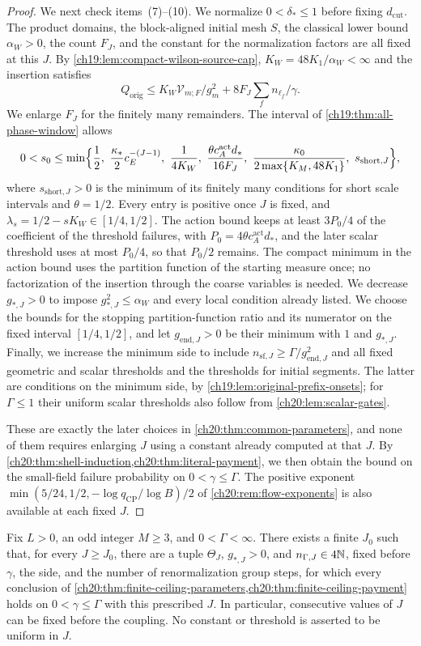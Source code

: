 \begin{proof}
We next check items~(7)--(10). We normalize $0<\delta_*\le1$ before fixing $d_{\mathrm{cut}}$. The product domains, the block-aligned initial mesh $S$, the classical lower bound $\alpha_W>0$, the count $F_J$, and the constant for the normalization factors are all fixed at this $J$. By \cref{ch19:lem:compact-wilson-source-cap}, $K_W=48K_1/\alpha_W<\infty$ and the insertion satisfies
\[
 Q_{\mathrm{orig}}\le K_W\mathcal V_{m;F}/g_m^2+8F_J\sum_fn_{\ell_f}/\gamma.
\]
We enlarge $F_J$ for the finitely many remainders. The interval of \cref{ch19:thm:all-phase-window} allows
\[
 0<s_0\le\min\Bigl\{\frac12,\ \frac{\kappa_*}2c_E^{-(J-1)},\ \frac1{4K_W},\ \frac{\theta c_A^{\mathrm{act}}d_*}{16F_J},\ \frac{\kappa_0}{2\max\{K_M,48K_1\}},\ s_{\mathrm{short},J}\Bigr\},
\]
where $s_{\mathrm{short},J}>0$ is the minimum of its finitely many conditions for short scale intervals and $\theta=1/2$. Every entry is positive once $J$ is fixed, and $\lambda_s=1/2-sK_W\in[1/4,1/2]$. The action bound keeps at least $3P_0/4$ of the coefficient of the threshold failures, with $P_0=4\theta c_A^{\mathrm{act}}d_*$, and the later scalar threshold uses at most $P_0/4$, so that $P_0/2$ remains. The compact minimum in the action bound uses the partition function of the starting measure once; no factorization of the insertion through the coarse variables is needed. We decrease $g_{*,J}>0$ to impose $g_{*,J}^2\le\alpha_W$ and every local condition already listed. We choose the bounds for the stopping partition-function ratio and its numerator on the fixed interval $[1/4,1/2]$, and let $g_{\mathrm{end},J}>0$ be their minimum with $1$ and $g_{*,J}$. Finally, we increase the minimum side to include $n_{\mathrm{sf},J}\ge\Gamma/g_{\mathrm{end},J}^2$ and all fixed geometric and scalar thresholds and the thresholds for initial segments. The latter are conditions on the minimum side, by \cref{ch19:lem:original-prefix-onsets}; for $\Gamma\le1$ their uniform scalar thresholds also follow from \cref{ch20:lem:scalar-gates}.

These are exactly the later choices in \cref{ch20:thm:common-parameters}, and none of them requires enlarging $J$ using a constant already computed at that $J$. By \cref{ch20:thm:shell-induction,ch20:thm:literal-payment}, we then obtain the bound on the small-field failure probability on $0<\gamma\le\Gamma$. The positive exponent $\min(5/24,1/2,-\log q_{\mathrm{CP}}/\log B)/2$ of \cref{ch20:rem:flow-exponents} is also available at each fixed $J$.
\end{proof}

\begin{corollary}\label{ch20:cor:finite-ceiling-macro-depths}
Fix $L>0$, an odd integer $M\ge3$, and $0<\Gamma<\infty$. There exists a finite $J_0$ such that, for every $J\ge J_0$, there are a tuple $\Theta_J$, $g_{*,J}>0$, and $n_{\Gamma,J}\in4\mathbb N$, fixed before $\gamma$, the side, and the number of renormalization group steps, for which every conclusion of \cref{ch20:thm:finite-ceiling-parameters,ch20:thm:finite-ceiling-payment} holds on $0<\gamma\le\Gamma$ with this prescribed $J$. In particular, consecutive values of $J$ can be fixed before the coupling. No constant or threshold is asserted to be uniform in $J$.
\end{corollary}

